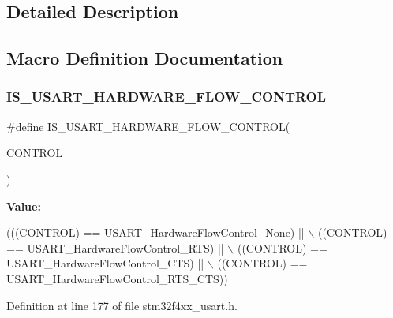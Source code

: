 \subsection{Detailed Description}


\subsection{Macro Definition Documentation}
\mbox{\label{group___u_s_a_r_t___hardware___flow___control_ga9b905eb465780173a2e98bc8b602c030}} 
\subsubsection{\texorpdfstring{I\+S\+\_\+\+U\+S\+A\+R\+T\+\_\+\+H\+A\+R\+D\+W\+A\+R\+E\+\_\+\+F\+L\+O\+W\+\_\+\+C\+O\+N\+T\+R\+OL}{IS\_USART\_HARDWARE\_FLOW\_CONTROL}}
{\footnotesize\ttfamily \#define I\+S\+\_\+\+U\+S\+A\+R\+T\+\_\+\+H\+A\+R\+D\+W\+A\+R\+E\+\_\+\+F\+L\+O\+W\+\_\+\+C\+O\+N\+T\+R\+OL(\begin{DoxyParamCaption}\item[{}]{C\+O\+N\+T\+R\+OL }\end{DoxyParamCaption})}

{\bfseries Value\+:}
\begin{DoxyCode}
(((CONTROL) == USART\_HardwareFlowControl\_None) || \(\backslash\)
                               ((CONTROL) == USART\_HardwareFlowControl\_RTS) || \(\backslash\)
                               ((CONTROL) == USART\_HardwareFlowControl\_CTS) || \(\backslash\)
                               ((CONTROL) == USART\_HardwareFlowControl\_RTS\_CTS))
\end{DoxyCode}


Definition at line 177 of file stm32f4xx\+\_\+usart.\+h.

